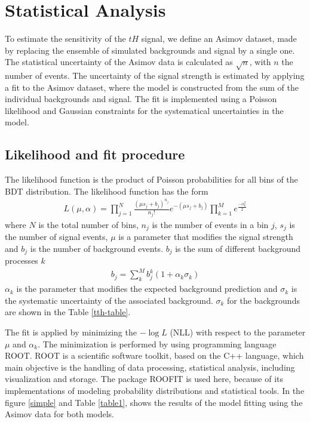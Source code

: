 \chapter{Statistical Analysis}
	To estimate the sensitivity of the $tH$ signal, we define an Asimov dataset, made by replacing the ensemble of simulated backgrounds and signal by a single one. The statistical uncertainty of the Asimov data is calculated as $\sqrt{n}$, with $n$ the number of events. The uncertainty of the signal strength is estimated by applying a fit to the Asimov dataset, where the model is constructed from the sum of the individual backgrounds and signal. The fit is implemented using a Poisson likelihood and Gaussian constraints for the systematical uncertainties in the model.
	
	\section{Likelihood and fit procedure}
	The likelihood function is the product of Poisson probabilities for all bins of the BDT distribution. The likelihood function has the form
	\begin{align}
		L(\mu,\alpha)=\prod_{j=1}^{N}\frac{(\mu s_j +b_j)^{n_j}}{n_j !}e^{-(\mu s_j+b_j)} \prod_{k=1}^M e^{\frac{-\alpha^2_k}{2}}
	\end{align}
	where $N$ is the total number of bins, $n_j$ is the number of events in a bin $j$, $s_j$ is the number of signal events, $\mu$ is a parameter that modifies the signal strength and $b_j$ is the number of background events.
	$b_j$ is the sum of different background processes $k$
	\begin{align}
		b_j=\sum_k^M b_j^k(1+ \alpha_k \sigma_k)
	\end{align}
	$\alpha_k$ is the parameter that modifies the expected background prediction and $\sigma_k$ is the systematic uncertainty of the associated background. $\sigma_k$ for the backgrounds are shown in the Table \ref{tth-table}.
	
	The fit is applied by minimizing the $-\log{L}$ (NLL) with respect to the parameter $\mu$ and $\alpha_k$. The minimization is performed by using programming language ROOT. ROOT is a scientific software toolkit, based on the C++ language, which main objective is the handling of data processing, statistical analysis, including visualization and storage. The package ROOFIT is used here, because of its implementations of modeling probability distributions and statistical tools\cite{roofit}. In the figure \ref{simple} and Table \ref{table1}, shows the results of the model fitting using the Asimov data for both models. 
	
